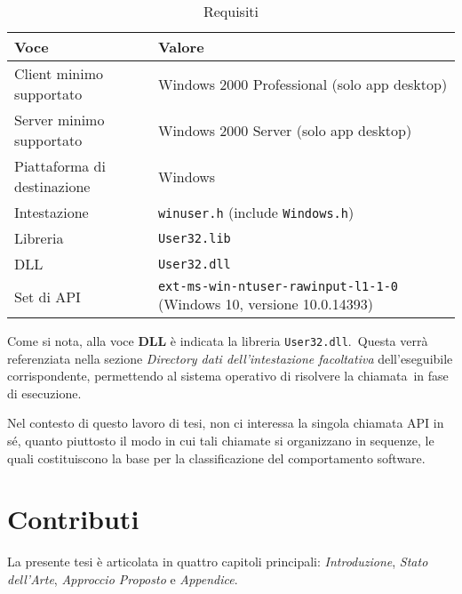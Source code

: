 \begin{table}[ht]
      \centering
      \caption{Requisiti}
      \label{tab:GetKeyboardState-Requisiti}
      \begin{tabular}{ll}
            \toprule
            \textbf{Voce}               & \textbf{Valore}                                                              \\
            \midrule
            Client minimo supportato    & Windows 2000 Professional (solo app desktop)                                 \\
            Server minimo supportato    & Windows 2000 Server (solo app desktop)                                       \\
            Piattaforma di destinazione & Windows                                                                      \\
            Intestazione                & \texttt{winuser.h} (include \texttt{Windows.h})                              \\
            Libreria                    & \texttt{User32.lib}                                                          \\
            DLL                         & \texttt{User32.dll}                                                          \\
            Set di API                  & \texttt{ext-ms-win-ntuser-rawinput-l1-1-0} (Windows 10, versione 10.0.14393) \\
            \bottomrule
      \end{tabular}
\end{table}

Come si nota, alla voce \textbf{DLL} è indicata la libreria \texttt{User32.dll}.\
Questa verrà referenziata nella sezione \textit{Directory dati dell’intestazione facoltativa} dell’eseguibile corrispondente, permettendo al sistema operativo di risolvere la chiamata\
in fase di esecuzione.

Nel contesto di questo lavoro di tesi, non ci interessa la singola chiamata API in sé, quanto piuttosto il modo in cui tali chiamate si organizzano in sequenze,
le quali costituiscono la base per la classificazione del comportamento software.

\section{Contributi}

La presente tesi è articolata in quattro capitoli principali: \textit{Introduzione}, \textit{Stato dell'Arte},
\textit{Approccio Proposto} e \textit{Appendice}.

